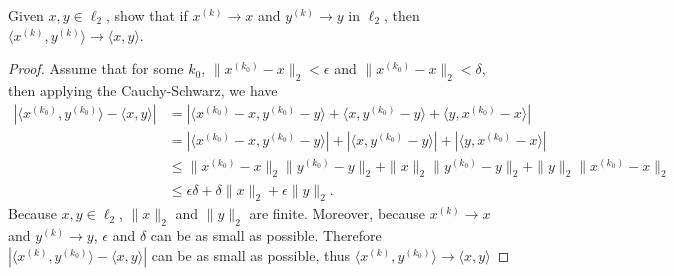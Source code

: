 \documentclass[12pt, a4paper]{article}
\theoremstyle{plain}
\begin{document}
\begin{exercise}{41}
Given $x,y\in\ell_2$, show that if $x^{(k)}\rightarrow x$ and $y^{(k)}\rightarrow y$ in $\ell_2$, then $\langle x^{(k)},y^{(k)}\rangle\rightarrow \langle x,y \rangle$.
\end{exercise}
	\begin{proof}
	Assume that for some $k_0$, $\|x^{(k_0)}-x\|_2<\epsilon$ and $\|x^{(k_0)}-x\|_2<\delta$, then applying the Cauchy-Schwarz, we have
	\begin{align*}
	|\langle x^{(k_0)},y^{(k_0)}\rangle - \langle x,y\rangle | &=|\langle{x^{(k_0)}-x,y^{(k_0)}-y}\rangle+\langle{x,y^{(k_0)}-y}\rangle+\langle{y,x^{(k_0)}-x}\rangle|\\
	&=|\langle{x^{(k_0)}-x,y^{(k_0)}-y}\rangle |+|\langle{x,y^{(k_0)}-y}\rangle|+|\langle{y,x^{(k_0)}-x}\rangle|\\
	&\leq \|x^{(k_0)}-x\|_2\|y^{(k_0)}-y\|_2+\|x\|_2\|y^{(k_0)}-y\|_2+\|y\|_2\|x^{(k_0)}-x\|_2\\
	&\leq \epsilon\delta +\delta	\|x\|_2+\epsilon\|y\|_2.
	\end{align*}
	Because $x,y\in \ell_2$, $\|x\|_2$ and $\|y\|_2$ are finite. Moreover, because $x^{(k)}\rightarrow x$ and $y^{(k)}\rightarrow y$, $\epsilon$ and $\delta$ can be as small as possible. Therefore $|\langle{x^{(k)},y^{(k_0)}}\rangle - \langle{x,y}\rangle|$ can be as small as possible, thus 
	$\langle{x^{(k)},y^{(k_0)}}\rangle\rightarrow\langle{x,y}\rangle$
	\end{proof}
\end{document}
